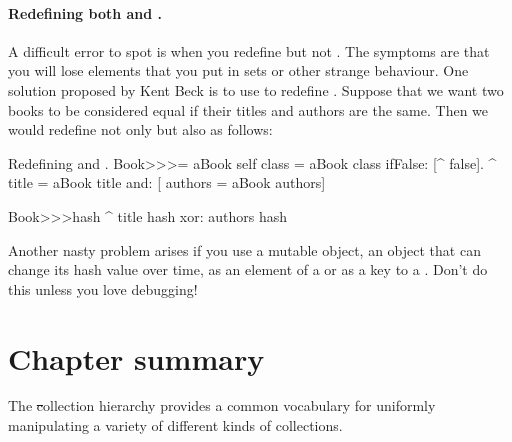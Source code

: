 \documentclass[a4paper,10pt,twoside]{book}
\begin{document}
\paragraph{Redefining both \ct{=} and .}
A difficult error to spot is when you redefine \ct{=} but not . The symptoms are that you will lose elements that you put in sets or other strange behaviour. One solution proposed by Kent Beck is to use  to redefine .
Suppose that we want two books to be considered equal if their titles and authors are the same.
Then we would redefine not only \ct{=} but also  as follows:

\begin{method}{Redefining \lct{=} and .}
Book>>>= aBook
   self class = aBook class ifFalse: [^ false].
   ^ title = aBook title and: [ authors = aBook authors]

Book>>>hash 
   ^ title hash xor: authors hash
\end{method}

Another nasty problem arises if you use a mutable object, \ie an object that can change its hash value over time, as an element of a  or as a key to a .
Don't do this unless you love debugging!

\section{Chapter summary}

The \st collection hierarchy provides a common vocabulary for uniformly manipulating a variety of different kinds of collections.
\end{document}
